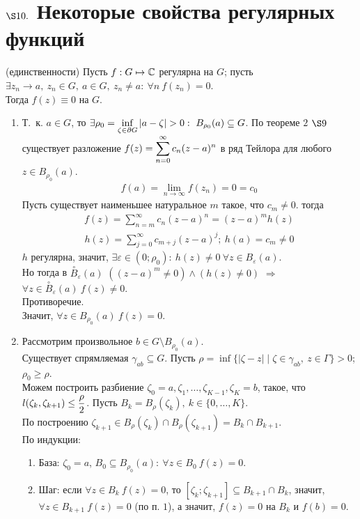 \section{$\S 10.$ Некоторые свойства регулярных функций}
\theorem (единственности)
Пусть $f: G \mapsto \mathbb{C}$ регулярна на $G$; пусть $\exists z_n \to a, \ z_n \in
G, \ a \in G, \ z_n \neq a: \ \forall n \ f(z_n) = 0$.
\\
Тогда $f(z) \equiv 0$ на $G$.
\pr
~
\begin{enumerate}
    \item Т.~к. $a \in G$, то $\exists \rho_0 = \displaystyle \inf_{\zeta \in \partial
      G}\left| a-\zeta \right| > 0: \ B_{\rho_0}(a) \subseteq G $. По теореме
    $2$ $\S 9$ существует разложение $f(z) = \displaystyle \sum_{n=0}^{\infty}c_n(z-a)^n$
    в ряд Тейлора для любого $z \in B_{\rho_0}(a)$.
    \begin{align*}
      f(a) = \lim_{n \to \infty} f(z_n) = 0 = c_0
    \end{align*}
    Пусть существует наименьшее натуральное $m$ такое, что $c_m \neq 0$. тогда
    \begin{align*}
      f(z) = \sum_{n=m}^{\infty}c_n(z-a)^n = (z-a)^mh(z)
    \end{align*}
    \begin{align*}
      h(z) = \sum_{j=0}^{\infty}c_{m+j}(z-a)^j; \ h(a) = c_m \neq 0
    \end{align*}
    $h$ регулярна, значит, $\exists \varepsilon \in (0; \rho_0): \ h(z) \neq 0
    \ \forall z \in B_{\varepsilon}(a)$.
    \\
    Но тогда в $\overset{\circ}{B}_{\varepsilon}(a)$ $((z-a)^m \neq 0) \wedge
    (h(z) \neq 0)$ $\Rightarrow$ $\forall z \in
    \overset{\circ}{B}_{\varepsilon}(a) \ f(z) \neq 0$.
    \\
    Противоречие.
    \\
    Значит, $\forall z \in B_{\rho_0}(a) \ f(z) = 0$.
    \item Рассмотрим произвольное $b \in G \setminus B_{\rho_0}(a)$.
    \\
    Существует спрямляемая $\gamma_{ab} \subseteq G$. Пусть $\rho = \inf\{\left|
        \zeta - z \right| \mid \zeta \in \gamma_{ab}, \ z \in \Gamma\} > 0$;
    $\rho_0 \geq \rho$.
    \\
    Можем построить разбиение $\zeta_0 = a, \zeta_1, \dots, \zeta_{K-1}, \zeta_K
    = b$, такое, что $l(\zeta_k, \zeta_{k+1}) \leq \displaystyle \frac{\rho}{2}$. Пусть
    $B_k = B_{\rho}(\zeta_k), \ k \in \{0, \dots, K\}$.
    \\
    По построению $\zeta_{k+1}\in B_{\rho}(\zeta_k) \cap B_{\rho}(\zeta_{k+1}) =
    B_k \cap B_{k+1}$.
    \\
    По индукции:
    \begin{enumerate}
        \item База: $\zeta_0 = a$, $B_0 \subseteq B_{\rho_0}(a): \ \forall z \in
        B_0 \ f(z) = 0$.
        \item Шаг: если $\forall z \in B_k \ f(z) = 0$, то $[\zeta_k;
        \zeta_{k+1}]\subseteq B_{k+1}\cap B_{k}$, значит, $\forall z \in B_{k+1}
        \ f(z) = 0$ (по п. $1$), а значит, $f(z) = 0$ на $B_k$ и $f(b) = 0 $.
    \end{enumerate}
\end{enumerate}
